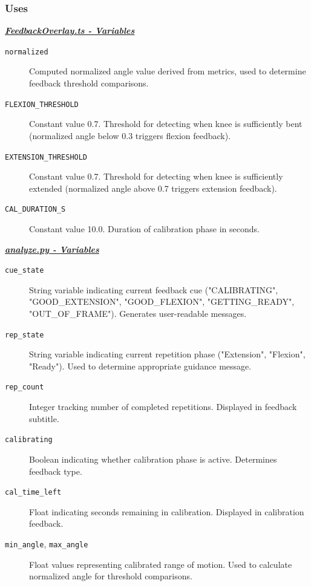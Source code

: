 \documentclass[12pt, titlepage]{article}
\begin{document}
\subsubsection{Uses}
\noindent \underline{\textbf{\textit{FeedbackOverlay.ts - Variables}}}
\begin{description}

\item[\texttt{normalized}] 
    Computed normalized angle value derived from metrics, used to determine feedback threshold comparisons.

\item[\texttt{FLEXION\_THRESHOLD}] 
    Constant value 0.7. Threshold for detecting when knee is sufficiently bent (normalized angle below 0.3 triggers flexion feedback).

\item[\texttt{EXTENSION\_THRESHOLD}] 
    Constant value 0.7. Threshold for detecting when knee is sufficiently extended (normalized angle above 0.7 triggers extension feedback).

\item[\texttt{CAL\_DURATION\_S}] 
    Constant value 10.0. Duration of calibration phase in seconds.
\end{description}
\noindent \underline{\textbf{\textit{analyze.py - Variables}}}
\begin{description}
\item[\texttt{cue\_state}] 
    String variable indicating current feedback cue ("CALIBRATING", "GOOD\_EXTENSION", "GOOD\_FLEXION", "GETTING\_READY", "OUT\_OF\_FRAME"). Generates user-readable messages.

\item[\texttt{rep\_state}] 
    String variable indicating current repetition phase ("Extension", "Flexion", "Ready"). Used to determine appropriate guidance message.

\item[\texttt{rep\_count}] 
    Integer tracking number of completed repetitions. Displayed in feedback subtitle.

\item[\texttt{calibrating}] 
    Boolean indicating whether calibration phase is active. Determines feedback type.

\item[\texttt{cal\_time\_left}] 
    Float indicating seconds remaining in calibration. Displayed in calibration feedback.

\item[\texttt{min\_angle}, \texttt{max\_angle}] 
    Float values representing calibrated range of motion. Used to calculate normalized angle for threshold comparisons.
\end{description}
\end{document}
